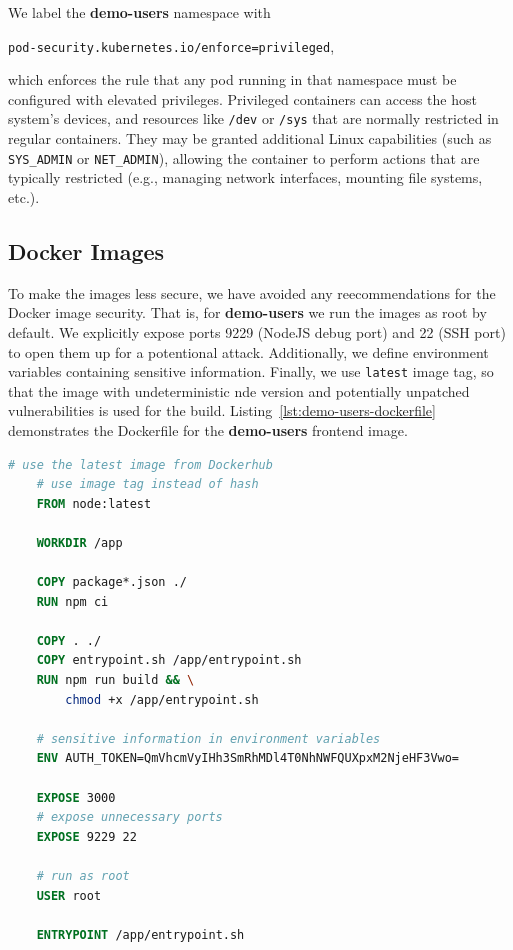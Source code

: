 We label the \textbf{demo-users} namespace with
\begin{center}
  \lstinline|pod-security.kubernetes.io/enforce=privileged|,
\end{center} 
which enforces the rule that any pod running in that namespace must be configured with elevated privileges. Privileged containers can access the host system's devices, and resources like \lstinline{/dev} or \lstinline{/sys} that are normally restricted in regular containers. They may be granted additional Linux capabilities (such as \lstinline{SYS_ADMIN} or \lstinline{NET_ADMIN}), allowing the container to perform actions that are typically restricted (e.g., managing network interfaces, mounting file systems, etc.).

\subsection{Docker Images}

To make the images less secure, we have avoided any reecommendations for the Docker image security. That is, for \textbf{demo-users} we run the images as root by default. We explicitly expose ports 9229 (NodeJS debug port) and 22 (SSH port) to open them up for a potentional attack. Additionally, we define environment variables containing sensitive information. Finally, we use \lstinline{latest} image tag, so that the image with undeterministic nde version and potentially unpatched vulnerabilities is used for the build. Listing~\ref{lst:demo-users-dockerfile} demonstrates the Dockerfile for the \textbf{demo-users} frontend image.

\begin{lstlisting}[language=Dockerfile, caption={[Demo-users frontend image]\textbf{demo-users} frontend image.}, label={lst:demo-users-dockerfile}]
    # use the latest image from Dockerhub
    # use image tag instead of hash
    FROM node:latest
    
    WORKDIR /app
    
    COPY package*.json ./
    RUN npm ci
    
    COPY . ./
    COPY entrypoint.sh /app/entrypoint.sh
    RUN npm run build && \
        chmod +x /app/entrypoint.sh
    
    # sensitive information in environment variables
    ENV AUTH_TOKEN=QmVhcmVyIHh3SmRhMDl4T0NhNWFQUXpxM2NjeHF3Vwo=
    
    EXPOSE 3000
    # expose unnecessary ports
    EXPOSE 9229 22
    
    # run as root
    USER root
    
    ENTRYPOINT /app/entrypoint.sh
\end{lstlisting}

